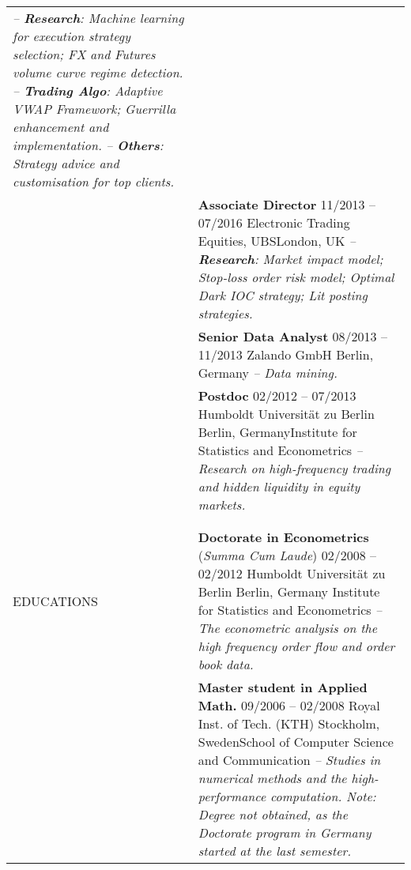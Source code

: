 \documentclass[a4paper,10pt]{article}
\begin{document}
\begin{longtable}[h]{p{}p{}}
  \emph{-- \textbf{Research}: Machine learning for execution strategy selection; FX and Futures volume curve regime detection.}\newline 
  \emph{-- \textbf{Trading Algo}: Adaptive VWAP Framework; Guerrilla enhancement and implementation.}\newline 
    \emph{-- \textbf{Others}: Strategy advice and customisation for top clients.}\\ 
  & \textbf{Associate Director} \hfill 11/2013 -- 07/2016 \newline Electronic Trading Equities, UBS\hfill London, UK\newline  
  \emph{-- \textbf{Research}: Market impact model; Stop-loss order risk model; Optimal Dark IOC strategy; Lit posting strategies.}\\
  & \textbf{Senior Data Analyst} \hfill 08/2013 -- 11/2013 \newline Zalando GmbH \hfill Berlin, Germany \newline  
  \emph{-- Data mining.} \\
  & \textbf{Postdoc} \hfill 02/2012 -- 07/2013 \newline Humboldt Universit\"at zu Berlin \hfill Berlin, Germany\newline Institute for Statistics and Econometrics \newline \emph{--Research on high-frequency trading and hidden liquidity in equity markets.} \\
  \\
  \\
EDUCATIONS
& \textbf{Doctorate in Econometrics} \small{(\emph{Summa Cum Laude})} \hfill 02/2008 -- 02/2012 \newline Humboldt Universit\"at zu Berlin \hfill Berlin, Germany \newline Institute for Statistics and Econometrics\newline
\emph{-- The econometric analysis on the high frequency order flow and order book data.}\\
  & \textbf{Master student in Applied Math.} \hfill 09/2006 -- 02/2008 \newline Royal Inst. of Tech. (KTH) \hfill Stockholm, Sweden\newline School of Computer Science and Communication \newline
  \emph{-- Studies in numerical methods and the high-performance computation. Note: Degree not obtained, as the Doctorate program in Germany started at the last semester.} \\

\end{longtable}
\end{document}
